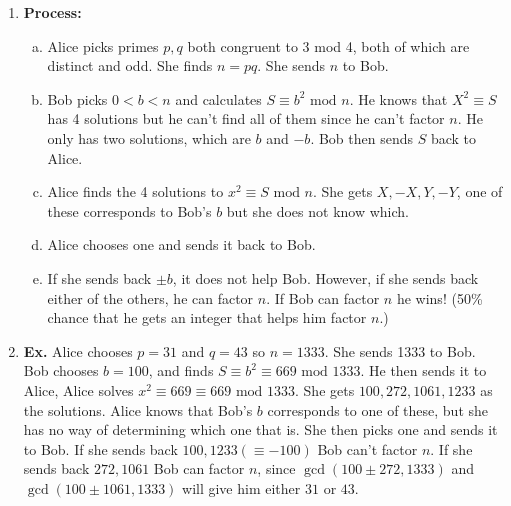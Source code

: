 \documentclass[class=article, crop=false]{standalone}
\begin{document}
\begin{enumerate}
	\item \textbf{Process:}
	\begin{enumerate}[(a)]
		\item Alice picks primes $p,q$ both congruent to 3 mod 4, both of which are distinct and odd.
		She finds $n=pq$. She sends $n$ to Bob.

		\item Bob picks $0<b<n$ and calculates $S\equiv b^2\mbox{ mod }n$. He knows that $X^2\equiv S$
		has 4 solutions but he can't find all of them since he can't factor $n$. He only has two solutions,
		which are $b$ and $-b$. Bob then sends $S$ back to Alice.

		\item Alice finds the 4 solutions to $x^2\equiv S\mbox{ mod }n$. She gets $X,-X,Y,-Y$,
		one of these corresponds to Bob's $b$ but she does not know which.

		\item Alice chooses one and sends it back to Bob.
		
		\item If she sends back $\pm b$, it does not help Bob. However, if she sends back
		either of the others, he can factor $n$. If Bob can factor $n$ he wins! (50\% chance that he gets
		an integer that helps him factor $n$.)
	\end{enumerate}

	\item \textbf{Ex.} Alice chooses $p=31$ and $q=43$ so $n=1333$.
	She sends 1333 to Bob. Bob chooses $b=100$, and finds $S\equiv b^2\equiv 669\mbox{ mod }1333$.
	He then sends it to Alice, Alice solves $x^2\equiv 669\equiv 669\mbox{ mod }1333$.
	She gets $100,272,1061,1233$ as the solutions. Alice knows that Bob's $b$ corresponds to
	one of these, but she has no way of determining which one that is. She then picks one and sends it to Bob.
	If she sends back $100,1233(\equiv -100)$ Bob can't factor $n$.
	If she sends back $272,1061$ Bob can factor $n$, since $\gcd(100\pm272, 1333)$ and $\gcd(100\pm1061, 1333)$
	will give him either $31$ or $43$.
\end{enumerate}

\end{document}
